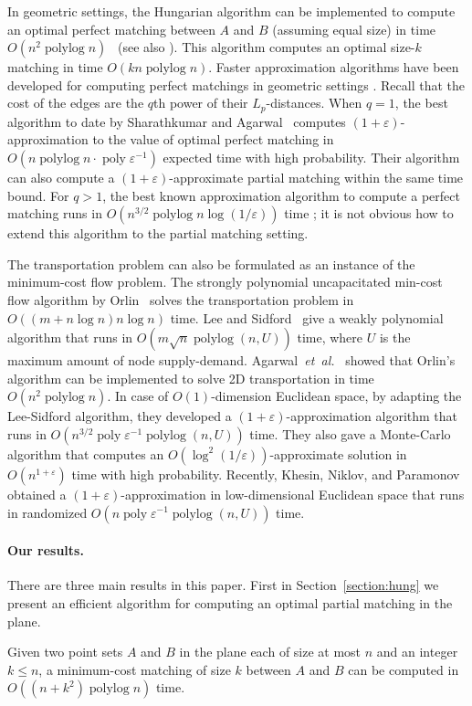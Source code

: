 \documentclass[11pt,twoside]{article}
\def\etal{\emph{et~al.}}
\def\etal{\textit{et~al.}}
\def\poly{\mathop{\mathrm{poly}}}
\def\polylog{\mathop{\mathrm{polylog}}}
\def\eps{\varepsilon}
\theoremstyle{plain}
\numberwithin{figure}{section}
\renewcommand{\subparagraph}{\paragraph}
\begin{document}
In geometric settings, the Hungarian algorithm can be implemented to compute
an optimal perfect matching between $A$ and $B$ (assuming equal size)
in time $O(n^2\polylog n)$~\cite{KMRSS17} (see also \cite{Vaidya89,AES99}).
This algorithm computes an optimal size-$k$ matching in time $O(kn\polylog n)$.
Faster approximation algorithms have been developed for computing perfect
matchings in geometric settings \cite{Vaidya89,V98,AV04,SA12}.
Recall that the cost of the edges are the $q$th power of their $L_p$-distances.
When $q = 1$, the best algorithm to date by Sharathkumar and Agarwal~\cite{SA12m}
computes $(1+\eps)$-approximation to the value of optimal perfect matching in
$O(n\polylog n \cdot \poly\eps^{-1})$ expected time with high probability.
Their algorithm can also compute a $(1+\eps)$-approximate partial
matching within the same time bound.
For $q > 1$, the best known approximation algorithm to compute a perfect
matching runs in $O(n^{3/2}\polylog n \log(1/\eps))$ time \cite{SA12};
it is not obvious how to extend this algorithm to the partial matching setting.

The transportation problem can also be formulated as an instance of the
minimum-cost flow problem.
The strongly polynomial uncapacitated min-cost flow algorithm by
Orlin~\cite{O93} solves the transportation problem in
$O((m + n\log n) n\log n)$ time.
Lee and Sidford~\cite{LS14} give a weakly polynomial algorithm that runs in
$O(m\sqrt{n}\polylog(n, U))$ time, where $U$ is the maximum amount of node supply-demand.
Agarwal~\etal~\cite{AFPVX17, AFPVX17arxiv} showed that Orlin's algorithm can be
implemented to solve 2D transportation in time $O(n^2\polylog n)$.
In case of $O(1)$-dimension Euclidean space,
by adapting the Lee-Sidford algorithm, they developed a
$(1+\eps)$-approximation algorithm that runs in $O(n^{3/2} \poly\eps^{-1} \polylog(n, U))$ time.
They also gave a Monte-Carlo algorithm that computes an
$O(\log^2(1/\eps))$-approximate solution in $O(n^{1+\eps})$ time with
high probability.
Recently, Khesin, Niklov, and Paramonov~\cite{KNP19} obtained a
$(1+\eps)$-approximation in low-dimensional Euclidean space
that runs in randomized $O(n \poly\eps^{-1} \polylog(n, U))$ time.

\subparagraph{Our results.}
There are three main results in this paper.
First in Section~\ref{section:hung} we present an efficient algorithm for
computing an optimal partial matching in the plane.

\begin{theorem}
\label{theorem:hung}
Given two point sets $A$ and $B$ in the plane each of size at most $n$ and an
integer $k \leq n$, a minimum-cost matching of size $k$ between $A$ and $B$ can
be computed in $O((n + k^2)\polylog n)$ time.
\end{theorem}
\end{document}
